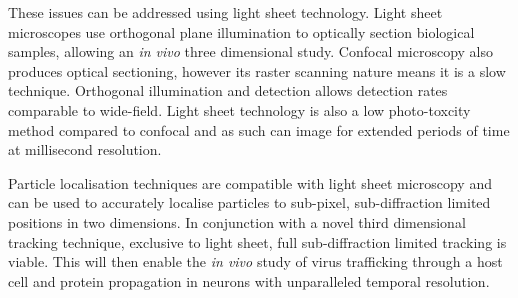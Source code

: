 These issues can be addressed using light sheet technology.
Light sheet microscopes use orthogonal plane illumination to optically section biological samples, allowing an \textit{in vivo} three dimensional study.
Confocal microscopy also produces optical sectioning, however its raster scanning nature means it is a slow technique.
Orthogonal illumination and detection allows detection rates comparable to wide-field.
Light sheet technology is also a low photo-toxcity method compared to confocal and as such can image for extended periods of time at millisecond resolution.

Particle localisation techniques are compatible with light sheet microscopy and can be used to accurately localise particles to sub-pixel, sub-diffraction limited positions in two dimensions.
In conjunction with a novel third dimensional tracking technique, exclusive to light sheet, full sub-diffraction limited tracking is viable\cite{Spille2015a}.
This will then enable the \textit{in vivo} study of virus trafficking through a host cell and protein propagation in neurons with unparalleled temporal resolution.












